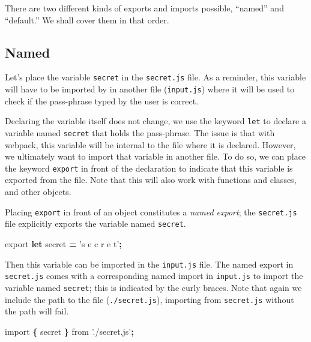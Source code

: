 \documentclass[10pt,]{krantz}
\makeatletter
\newenvironment{Shaded}{\begin{snugshade}}{\end{snugshade}}
\newcommand{\ImportTok}[1]{#1}
\newcommand{\KeywordTok}[1]{\textcolor[rgb]{0.27,0.27,0.27}{\textbf{#1}}}
\newcommand{\NormalTok}[1]{#1}
\newcommand{\OperatorTok}[1]{\textcolor[rgb]{0.43,0.43,0.43}{\textbf{#1}}}
\newcommand{\StringTok}[1]{\textcolor[rgb]{0.5,0.5,0.5}{#1}}
\newenvironment{kframe}{%
\medskip{}
\setlength{\fboxsep}{.8em}
 \def\at@end@of@kframe{}%
 \ifinner\ifhmode%
  \def\at@end@of@kframe{\end{minipage}}%
  \begin{minipage}{\columnwidth}%
 \fi\fi%
 \def\FrameCommand##1{\hskip\@totalleftmargin \hskip-\fboxsep
 \colorbox{shadecolor}{##1}\hskip-\fboxsep
     \hskip-\linewidth \hskip-\@totalleftmargin \hskip\columnwidth}%
 \MakeFramed {\advance\hsize-\width
   \@totalleftmargin\z@ \linewidth\hsize
   \@setminipage}}%
 {\par\unskip\endMakeFramed%
 \at@end@of@kframe}
\renewenvironment{Shaded}{\begin{kframe}}{\end{kframe}}
\makeatother
\begin{document}
There are two different kinds of exports and imports possible, ``named'' and ``default.'' We shall cover them in that order.

\hypertarget{webpack-intro-import-export-named}{%
\subsection{Named}\label{webpack-intro-import-export-named}}

Let's place the variable \texttt{secret} in the \texttt{secret.js} file. As a reminder, this variable will have to be imported by in another file (\texttt{input.js}) where it will be used to check if the pass-phrase typed by the user is correct.

Declaring the variable itself does not change, we use the keyword \texttt{let} to declare a variable named \texttt{secret} that holds the pass-phrase. The issue is that with webpack, this variable will be internal to the file where it is declared. However, we ultimately want to import that variable in another file. To do so, we can place the keyword \texttt{export} in front of the declaration to indicate that this variable is exported from the file. Note that this will also work with functions and classes, and other objects.

Placing \texttt{export} in front of an object constitutes a \emph{named export}; the \texttt{secret.js} file explicitly exports the variable named \texttt{secret}.

\begin{Shaded}
\begin{Highlighting}[]
\ImportTok{export} \KeywordTok{let}\NormalTok{ secret }\OperatorTok{=} \StringTok{'s e c r e t'}\OperatorTok{;}
\end{Highlighting}
\end{Shaded}

Then this variable can be imported in the \texttt{input.js} file. The named export in \texttt{secret.js} comes with a corresponding named import in \texttt{input.js} to import the variable named \texttt{secret}; this is indicated by the curly braces. Note that again we include the path to the file (\texttt{./secret.js}), importing from \texttt{secret.js} without the path will fail.

\begin{Shaded}
\begin{Highlighting}[]
\ImportTok{import} \OperatorTok{\{}\NormalTok{ secret }\OperatorTok{\}} \ImportTok{from} \StringTok{'./secret.js'}\OperatorTok{;}
\end{Highlighting}
\end{Shaded}
\end{document}
